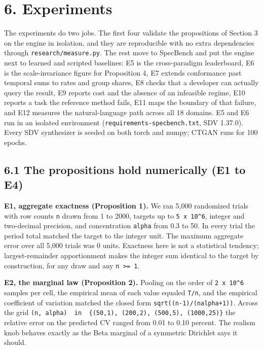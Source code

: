 \hypertarget{experiments}{%
\section{6. Experiments}\label{experiments}}

The experiments do two jobs. The first four validate the propositions of
Section 3 on the engine in isolation, and they are reproducible with no
extra dependencies through \texttt{research/\allowbreak{}measure.py}. The rest move
to SpecBench and put the engine next to learned and scripted baselines:
E5 is the cross-paradigm leaderboard, E6 is the scale-invariance figure
for Proposition 4, E7 extends conformance past temporal sums to rates
and group shares, E8 checks that a developer can actually query the
result, E9 reports cost and the absence of an infeasible regime, E10
reports a task the reference method fails, E11 maps the boundary of that
failure, and E12 measures the natural-language path across all 18
domains. E5 and E6 run in an isolated environment
(\texttt{requirements-specbench.txt}, SDV 1.37.0). Every SDV synthesizer
is seeded on both torch and numpy; CTGAN runs for 100 epochs.

\hypertarget{the-propositions-hold-numerically-e1-to-e4}{%
\subsection{6.1 The propositions hold numerically (E1 to
E4)}\label{the-propositions-hold-numerically-e1-to-e4}}

\textbf{E1, aggregate exactness (Proposition 1).} We ran 5,000
randomized trials with row counts \texttt{n} drawn from 1 to 2000,
targets up to \texttt{5\ x\ 10\^{}6}, integer and two-decimal precision,
and concentration \texttt{alpha} from 0.3 to 50. In every trial the
period total matched the target to the integer unit. The maximum
aggregate error over all 5,000 trials was 0 units. Exactness here is not
a statistical tendency; largest-remainder apportionment makes the
integer sum identical to the target by construction, for any draw and
any \texttt{n\ \textgreater{}=\ 1}.

\textbf{E2, the marginal law (Proposition 2).} Pooling on the order of
\texttt{2\ x\ 10\^{}6} samples per cell, the empirical mean of each
value equaled \texttt{T/\allowbreak{}n}, and the empirical coefficient of variation
matched the closed form \texttt{sqrt((n-1)/\allowbreak{}(nalpha+1))}. Across the grid
\texttt{(n,\ alpha)\ \ in\ \ \{(50,1),\ (200,2),\ (500,5),\ (1000,25)\}}
the relative error on the predicted CV ranged from 0.01 to 0.10 percent.
The realism knob behaves exactly as the Beta marginal of a symmetric
Dirichlet says it should.

